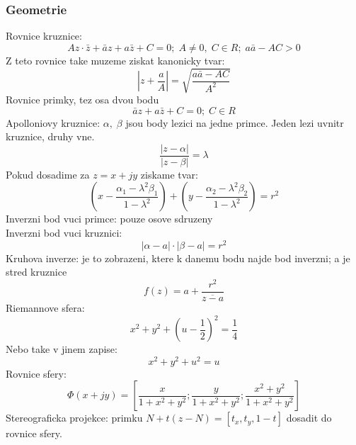 \subsubsection*{Geometrie}
Rovnice kruznice:
\begin{equation}
\label{eq:kruznice}
Az\cdot \bar{z}+\bar{a}z+a\bar{z}+C = 0; \; A \neq 0,\; C \in R; \; a\bar{a}-AC >0
\end{equation}
Z teto rovnice take muzeme ziskat kanonicky tvar:
\begin{equation}
\label{eq:kanonicky}
|z+\frac{a}{A}|=\sqrt{\frac{a\bar{a}-AC}{A^2}}
\end{equation}
Rovnice primky, tez osa dvou bodu
\begin{equation}
\label{eq:primka}
\bar{a}z+a\bar{z}+C=0; \; C\in R
\end{equation}
Apolloniovy kruznice: $\alpha,\; \beta$ jsou body lezici na jedne primce. Jeden lezi uvnitr kruznice, druhy vne.
\begin{equation}
\label{eq:apollo}
\frac{|z-\alpha |}{|z-\beta |}=\lambda
\end{equation}
Pokud dosadime za $z=x+jy$ ziskame tvar:
\begin{equation}
\label{eq:apollo_xy}
\left( x- \frac{\alpha_1 - \lambda^2 \beta_1}{1-\lambda^2}\right)+ \left( y - \frac{\alpha_2 - \lambda^2 \beta_2}{1-\lambda^2}\right)= r^2 
\end{equation}
Inverzni bod vuci primce: pouze osove sdruzeny\\
Inverzni bod vuci kruznici:
\begin{equation}
\label{eq:inverzni_kr}
|\alpha-a|\cdot |\beta - a| = r^2
\end{equation}
Kruhova inverze: je to zobrazeni, ktere k danemu bodu najde bod inverzni; a je stred kruznice
\begin{equation}
\label{eq:kruh_inverze}
f(z)=a+\frac{r^2}{\overline{z-a}}
\end{equation}
Riemannove sfera:
\begin{equation}
\label{eq:riemann}
x^2+y^2+\left( u- \frac{1}{2}\right)^2 = \frac{1}{4}
\end{equation}
Nebo take v jinem zapise:
\begin{equation}
\label{eq:rieamann_2}
x^2+y^2+u^2 = u
\end{equation}
Rovnice sfery:
\begin{equation}
\label{eq:sfera}
\Phi (x+jy) = \left[ \frac{x}{1+x^2+y^2}; \frac{y}{1+x^2+y^2};\frac{x^2+y^2}{1+x^2+y^2} \right]
\end{equation}
Stereograficka projekce: primku $N+t(z-N)=[t_x, t_y,1-t]$ dosadit do rovnice sfery.

